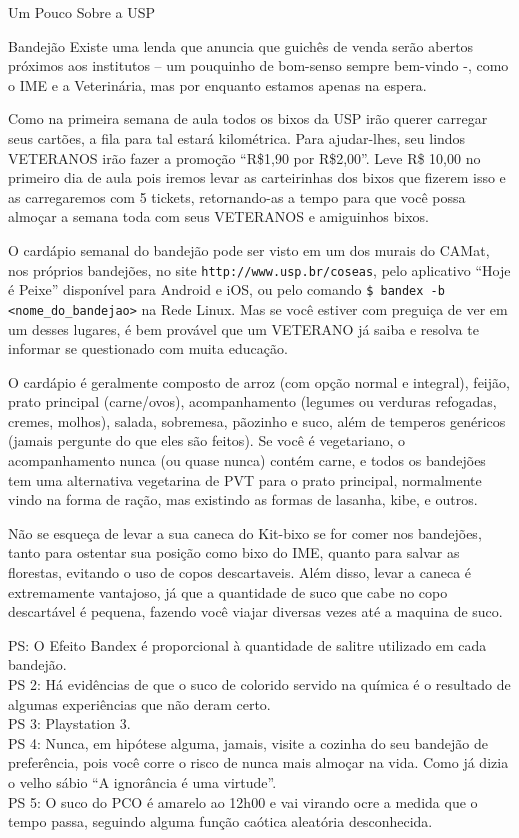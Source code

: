 \begin{secao}{Um Pouco Sobre a USP}
\begin{subsecao}{Bandejão}
Existe uma lenda que anuncia que guichês de venda serão abertos próximos aos
institutos – um pouquinho de bom-senso sempre bem-vindo -, como o IME e
a Veterinária, mas por enquanto estamos apenas na espera.

Como na primeira semana de aula todos os bixos da USP irão querer carregar seus
cartões, a fila para tal estará kilométrica. Para ajudar-lhes, seu lindos VETERANOS 
irão fazer a promoção ``R\$1,90 por R\$2,00''. Leve R\$ 10,00 no primeiro dia de
aula pois iremos levar as carteirinhas dos bixos que fizerem isso e as
carregaremos com 5 tickets, retornando-as a tempo para que você possa almoçar a 
semana toda com seus VETERANOS e amiguinhos bixos.

O cardápio semanal do bandejão pode ser visto em um dos murais do CAMat, nos
próprios bandejões, no site {\tt http://www.usp.br/coseas}, pelo aplicativo 
``Hoje é Peixe'' disponível para Android e iOS, ou pelo comando 
{\tt \$ bandex -b <nome\_do\_bandejao>} na Rede Linux. Mas se você estiver
com preguiça de ver em um desses lugares, é bem provável que um VETERANO já saiba
e resolva te informar se questionado com muita educação.

O cardápio é geralmente composto de arroz (com opção normal e integral), feijão,
prato principal (carne/ovos), acompanhamento (legumes ou verduras refogadas, 
cremes, molhos), salada, sobremesa, pãozinho e suco, além de temperos genéricos
(jamais pergunte do que eles são feitos). Se você é vegetariano, o 
acompanhamento nunca (ou quase nunca) contém carne, e todos os bandejões tem uma
alternativa vegetarina de PVT para o prato principal, normalmente vindo na forma
de ração, mas existindo as formas de lasanha, kibe, e outros.


Não se esqueça de levar a sua caneca do Kit-bixo se for comer nos bandejões,
tanto para ostentar sua posição como bixo do IME, quanto para salvar as florestas, 
evitando o uso de copos descartaveis. Além disso, levar a caneca é extremamente
vantajoso, já que a quantidade de suco que cabe no copo descartável é pequena,
fazendo você viajar diversas vezes até a maquina de suco.


PS: O Efeito Bandex é proporcional à quantidade de salitre utilizado em cada bandejão.\\
PS 2: Há evidências de que o suco de colorido servido na química é o resultado de algumas
experiências que não deram certo.\\
PS 3: Playstation 3.\\
PS 4: Nunca, em hipótese alguma, jamais, visite a cozinha do seu bandejão de preferência,
pois você corre o risco de nunca mais almoçar na vida. Como já dizia o velho sábio ``A
ignorância é uma virtude''.\\
PS 5: O suco do PCO é amarelo ao 12h00 e vai virando ocre a medida que o tempo passa,
seguindo alguma função caótica aleatória desconhecida.


\pagebreak

\end{subsecao}

\end{secao}

